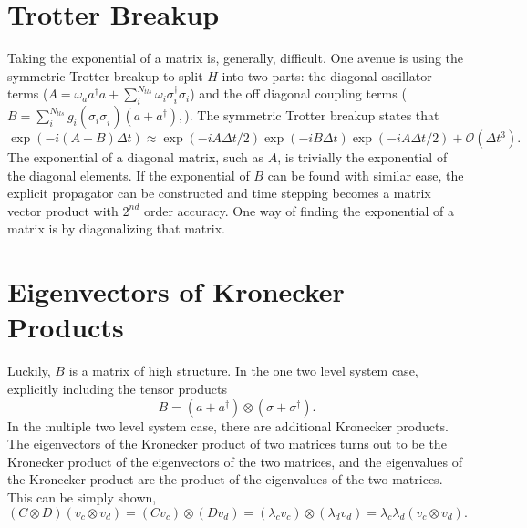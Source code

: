 \documentclass{article}
\begin{document}
\section{Trotter Breakup}
Taking the exponential of a matrix is, generally, difficult. One avenue is using
the symmetric Trotter breakup to split $H$ into two parts: the diagonal
oscillator terms ($A = \omega_a a^\dagger a + \sum_i^{N_{tls}}\omega_i
\sigma_i^\dagger \sigma_i$) and the off diagonal coupling terms ($B =
\sum_i^{N_{tls}} g_i ( \sigma_i \sigma_i^\dagger) ( a + a^\dagger),$). The
symmetric Trotter breakup states that
\begin{equation} \label{trotter}
  \exp(-i(A+B)\Delta t) \approx \exp(-i A \Delta t/2) \exp(-i B \Delta t) \exp(-i A \Delta t/2) + \mathcal{O} (\Delta t ^3).
\end{equation}
The exponential of a diagonal matrix, such as $A$, is trivially the exponential
of the diagonal elements. If the exponential of $B$ can be found with similar
ease, the explicit propagator can be constructed and time stepping becomes a
matrix vector product with $2^{nd}$ order accuracy. One way of finding the
exponential of a matrix is by diagonalizing that matrix.

\section{Eigenvectors of Kronecker Products}
Luckily, $B$ is a matrix of high structure. In the one two level system case,
explicitly including the tensor products
\begin{equation}\label{explicit_b}
  B = (a + a^\dagger) \otimes (\sigma + \sigma^\dagger ).
\end{equation}
In the multiple two level system case, there are additional Kronecker products.
The eigenvectors of the Kronecker product of two matrices turns
out to be the Kronecker product of the eigenvectors of the two matrices, and the
eigenvalues of the Kronecker product are the product of the eigenvalues of the
two matrices. This can be simply shown,
\begin{equation}\label{kron_ev}
  (C\otimes D) (v_c \otimes v_d) = (C v_c ) \otimes (D v_d) = (\lambda_c v_c) \otimes (\lambda_d v_d) = \lambda_c \lambda_d (v_c \otimes v_d).
\end{equation}
\end{document}
